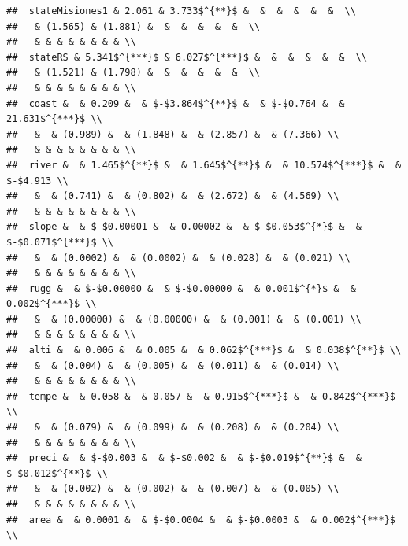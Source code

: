 \documentclass[
  a4paper,
]{article}
\begin{document}
\begin{verbatim}
##  stateMisiones1 & 2.061 & 3.733$^{**}$ &  &  &  &  &  &  \\ 
##   & (1.565) & (1.881) &  &  &  &  &  &  \\ 
##   & & & & & & & & \\ 
##  stateRS & 5.341$^{***}$ & 6.027$^{***}$ &  &  &  &  &  &  \\ 
##   & (1.521) & (1.798) &  &  &  &  &  &  \\ 
##   & & & & & & & & \\ 
##  coast &  & 0.209 &  & $-$3.864$^{**}$ &  & $-$0.764 &  & 21.631$^{***}$ \\ 
##   &  & (0.989) &  & (1.848) &  & (2.857) &  & (7.366) \\ 
##   & & & & & & & & \\ 
##  river &  & 1.465$^{**}$ &  & 1.645$^{**}$ &  & 10.574$^{***}$ &  & $-$4.913 \\ 
##   &  & (0.741) &  & (0.802) &  & (2.672) &  & (4.569) \\ 
##   & & & & & & & & \\ 
##  slope &  & $-$0.00001 &  & 0.00002 &  & $-$0.053$^{*}$ &  & $-$0.071$^{***}$ \\ 
##   &  & (0.0002) &  & (0.0002) &  & (0.028) &  & (0.021) \\ 
##   & & & & & & & & \\ 
##  rugg &  & $-$0.00000 &  & $-$0.00000 &  & 0.001$^{*}$ &  & 0.002$^{***}$ \\ 
##   &  & (0.00000) &  & (0.00000) &  & (0.001) &  & (0.001) \\ 
##   & & & & & & & & \\ 
##  alti &  & 0.006 &  & 0.005 &  & 0.062$^{***}$ &  & 0.038$^{**}$ \\ 
##   &  & (0.004) &  & (0.005) &  & (0.011) &  & (0.014) \\ 
##   & & & & & & & & \\ 
##  tempe &  & 0.058 &  & 0.057 &  & 0.915$^{***}$ &  & 0.842$^{***}$ \\ 
##   &  & (0.079) &  & (0.099) &  & (0.208) &  & (0.204) \\ 
##   & & & & & & & & \\ 
##  preci &  & $-$0.003 &  & $-$0.002 &  & $-$0.019$^{**}$ &  & $-$0.012$^{**}$ \\ 
##   &  & (0.002) &  & (0.002) &  & (0.007) &  & (0.005) \\ 
##   & & & & & & & & \\ 
##  area &  & 0.0001 &  & $-$0.0004 &  & $-$0.0003 &  & 0.002$^{***}$ \\ 

\end{verbatim}
\end{document}
